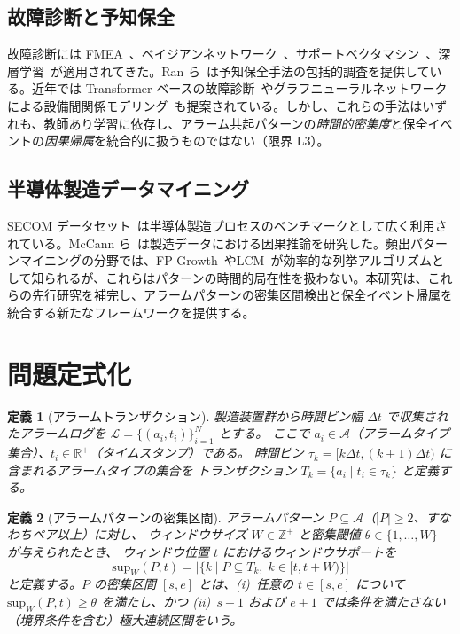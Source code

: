 \documentclass[11pt]{article}
\newtheorem{definition}{定義}
\begin{document}
\subsection{故障診断と予知保全}

故障診断には FMEA~\citep{stamatis2003fmea}、ベイジアンネットワーク~\citep{weber2012bayesian}、サポートベクタマシン~\citep{susto2015machine}、深層学習~\citep{khan2018deep,li2020deep}が適用されてきた。Ran ら~\citep{ran2019survey}は予知保全手法の包括的調査を提供している。近年では Transformer ベースの故障診断~\citep{wen2023transformer}やグラフニューラルネットワークによる設備間関係モデリング~\citep{chen2021gnn_fault}も提案されている。しかし、これらの手法はいずれも、教師あり学習に依存し、アラーム共起パターンの\emph{時間的密集度}と保全イベントの\emph{因果帰属}を統合的に扱うものではない（限界 L3）。

\subsection{半導体製造データマイニング}

SECOM データセット~\citep{he2007secom}は半導体製造プロセスのベンチマークとして広く利用されている。McCann ら~\citep{mccann2015causality}は製造データにおける因果推論を研究した。頻出パターンマイニングの分野では、FP-Growth~\citep{han2000fpgrowth}やLCM~\citep{uno2004lcm}が効率的な列挙アルゴリズムとして知られるが、これらはパターンの時間的局在性を扱わない。本研究は、これらの先行研究を補完し、アラームパターンの密集区間検出と保全イベント帰属を統合する新たなフレームワークを提供する。

\section{問題定式化}\label{sec:formulation}

\begin{definition}[アラームトランザクション]
製造装置群から時間ビン幅 $\Delta t$ で収集されたアラームログを
$\mathcal{L} = \{(a_i, t_i)\}_{i=1}^{N}$ とする。
ここで $a_i \in \mathcal{A}$（アラームタイプ集合）、$t_i \in \mathbb{R}^+$（タイムスタンプ）である。
時間ビン $\tau_k = [k\Delta t, (k+1)\Delta t)$ に含まれるアラームタイプの集合を
トランザクション $T_k = \{a_i \mid t_i \in \tau_k\}$ と定義する。
\end{definition}

\begin{definition}[アラームパターンの密集区間]
\label{def:dense_interval}
アラームパターン $P \subseteq \mathcal{A}$（$|P| \geq 2$、すなわちペア以上）に対し、
ウィンドウサイズ $W \in \mathbb{Z}^+$ と密集閾値 $\theta \in \{1,\ldots,W\}$ が与えられたとき、
ウィンドウ位置 $t$ におけるウィンドウサポートを
\begin{equation}
\mathrm{sup}_W(P, t) = |\{k \mid P \subseteq T_k,\; k \in [t, t+W)\}|
\end{equation}
と定義する。$P$ の\emph{密集区間} $[s, e]$ とは、(i)~任意の $t \in [s, e]$ について $\mathrm{sup}_W(P, t) \geq \theta$ を満たし、かつ (ii)~$s-1$ および $e+1$ では条件を満たさない（境界条件を含む）\emph{極大}連続区間をいう。
\end{definition}
\end{document}
